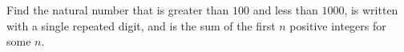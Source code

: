 Find the natural number that is greater than $100$ and less than $1000$, is written with a single repeated digit, and is the sum of the first $n$ positive integers for some $n$.
